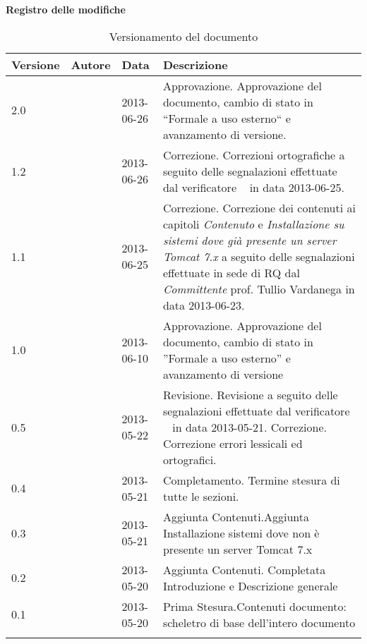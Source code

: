 \Large{\textbf{Registro delle modifiche}}\\
\normalsize

\label{tabVers}
\begin{longtable}{p{} p{} p{} p{}} 

\toprule
\textbf{Versione}	&	\textbf{Autore}	&	\textbf{Data}	&	\textbf{Descrizione}\\
\midrule
2.0	&	\SL &	2013-06-26 	&	Approvazione. \newline Approvazione del documento, cambio di stato in ``Formale a uso esterno`` e avanzamento di versione.\\
\midrule
1.2	&	\AB &	2013-06-26 	&	Correzione. \newline Correzioni ortografiche a seguito delle segnalazioni effettuate dal verificatore \MB~ in data 2013-06-25.\\
\midrule
1.1	&	\AB &	2013-06-25 	&	Correzione. \newline Correzione dei contenuti ai capitoli \emph{Contenuto} e \emph{Installazione su sistemi dove già presente un server Tomcat 7.x}  a seguito delle segnalazioni effettuate in sede di RQ dal \emph{Committente} prof. Tullio Vardanega in data 2013-06-23.\\
\midrule
1.0	&	\FZ &	2013-06-10 	&	Approvazione.\newline
						Approvazione del documento, cambio di stato in ”Formale a uso esterno” e avanzamento di versione\\
\midrule
0.5	&	\VP &	2013-05-22 	&	Revisione.\newline
						Revisione a seguito delle segnalazioni effettuate dal verificatore \EZ~ in data 2013-05-21.\newline
						Correzione.\newline
						Correzione errori lessicali ed ortografici.\\
\midrule
0.4	&	\VP &	2013-05-21 	&	Completamento.\newline
						Termine stesura di tutte le sezioni.\\
\midrule
0.3	&	\VP &	2013-05-21 	&	Aggiunta Contenuti.\newline Aggiunta Installazione sistemi dove non \`e presente un server Tomcat 7.x\\
\midrule
0.2	&	\VP &	2013-05-20 	&	Aggiunta Contenuti.\newline
						Completata Introduzione e Descrizione generale\\
\midrule
0.1	&	\VP &	2013-05-20 	&	Prima Stesura.\newline Contenuti documento: scheletro di base dell'intero documento\\
\bottomrule

\caption{Versionamento del documento}
\end{longtable}

